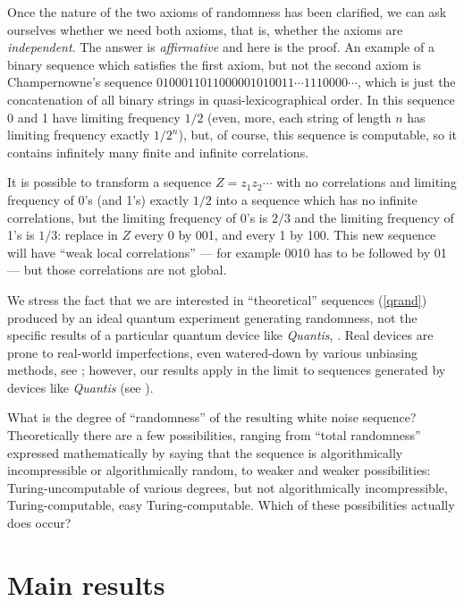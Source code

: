\documentclass[pra,amsfonts,preprint,showkeys]{revtex4}
\begin{document}
Once the nature of the two axioms of randomness has been clarified, we
can ask ourselves whether we need both axioms, that is, whether the axioms are {\it independent}. The answer is {\it affirmative} and here
is the proof.
An example of a binary sequence which satisfies
the first axiom, but not the second axiom  is Champernowne's  sequence
$0100011011000001010011 \cdots 1110000 \cdots$, which is just the  concatenation of all binary strings in quasi-lexicographical order. In this sequence 0 and 1 have limiting frequency $1/2$ (even, more, each
string of length $n$ has limiting frequency exactly $1/2^{n}$), but, of course, this sequence is computable, so  it contains infinitely many finite and infinite correlations.


It is possible to transform a sequence $Z = z_{1}z_{2}\cdots$ with no correlations and limiting frequency of 0's (and 1's) exactly $1/2$ into
a sequence which has no infinite correlations, but
the limiting frequency of 0's is $2/3$ and the limiting frequency of 1's is $1/3$:
 replace in $Z$ every 0 by 001, and every 1 by 100. This new sequence will have ``weak local correlations'' --- for example 0010 has to be followed by 01 --- but those correlations  are not global.


We stress the fact that we are interested in  ``theoretical'' sequences (\ref{qrand}) produced by an ideal quantum experiment generating randomness, not the specific results of a particular quantum device
like {\it Quantis}, \cite{Quantis}. Real devices are
prone to real-world imperfections, even watered-down by various
unbiasing methods, see \cite{Cris04}; however, our results apply in the limit to sequences generated by devices like  {\it Quantis} (see
\cite{Cris04,calude-dinneen05}).


What is the degree of ``randomness'' of the resulting white noise sequence? Theoretically there are a few possibilities, ranging from
``total randomness'' expressed mathematically by saying that the sequence is algorithmically incompressible or algorithmically random,\cite{calude:02}  to weaker and weaker possibilities: Turing-uncomputable of various degrees, but not algorithmically incompressible, Turing-computable, easy Turing-computable. Which of these possibilities actually does occur?


\section{Main results}
\end{document}
